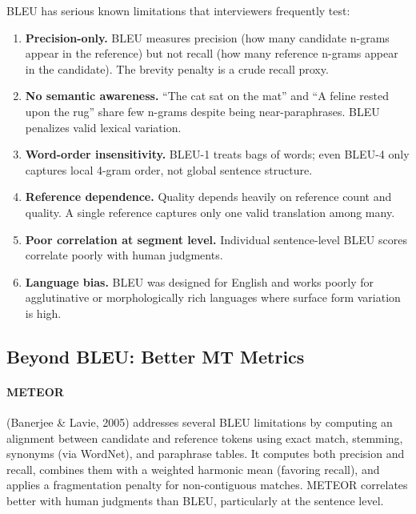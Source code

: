 \begin{warningbox}
BLEU has serious known limitations that interviewers frequently test:
\begin{enumerate}[label=(\arabic*)]
    \item \textbf{Precision-only.}  BLEU measures precision (how many candidate
          n-grams appear in the reference) but not recall (how many reference
          n-grams appear in the candidate).  The brevity penalty is a crude
          recall proxy.
    \item \textbf{No semantic awareness.}  ``The cat sat on the mat'' and
          ``A feline rested upon the rug'' share few n-grams despite being
          near-paraphrases.  BLEU penalizes valid lexical variation.
    \item \textbf{Word-order insensitivity.}  BLEU-1 treats bags of words; even
          BLEU-4 only captures local 4-gram order, not global sentence structure.
    \item \textbf{Reference dependence.}  Quality depends heavily on reference
          count and quality.  A single reference captures only one valid
          translation among many.
    \item \textbf{Poor correlation at segment level.}  Individual sentence-level
          BLEU scores correlate poorly with human judgments.
    \item \textbf{Language bias.}  BLEU was designed for English and works poorly
          for agglutinative or morphologically rich languages where surface form
          variation is high.
\end{enumerate}
\end{warningbox}

\subsection{Beyond BLEU: Better MT Metrics}

\paragraph{METEOR} (Banerjee \& Lavie, 2005) addresses several BLEU limitations
by computing an alignment between candidate and reference tokens using exact
match, stemming, synonyms (via WordNet), and paraphrase tables.  It computes
both precision and recall, combines them with a weighted harmonic mean (favoring
recall), and applies a fragmentation penalty for non-contiguous matches.  METEOR
correlates better with human judgments than BLEU, particularly at the sentence
level.

